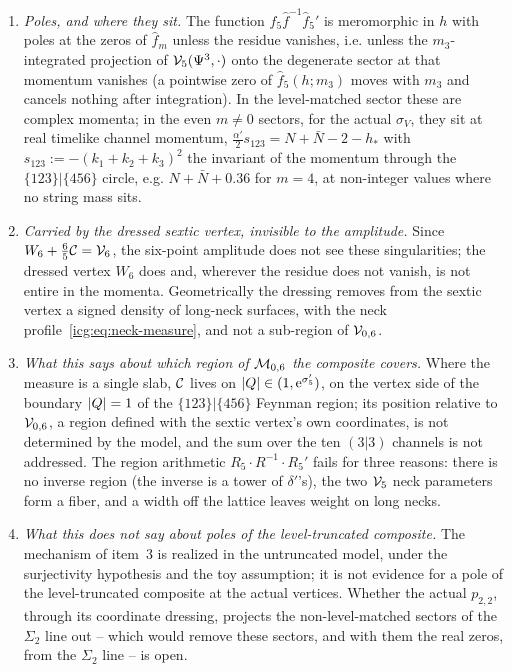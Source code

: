 \begin{enumerate}[leftmargin=*, itemsep=0.3ex]
    In all three cases it is neither a union of Feynman regions nor a sub-region with the standard measure.
  \item \emph{Poles, and where they sit.}
    The function $\hat f_5 \hat f^{-1} \hat f_5'$ is meromorphic in $h$ with poles at the zeros of $\hat f_m$ unless the residue vanishes, i.e. unless the $m_3$-integrated projection of ${\mathcal{V}}_5(\Psi^3, \cdot)$ onto the degenerate sector at that momentum vanishes (a pointwise zero of $\hat f_5(h; m_3)$ moves with $m_3$ and cancels nothing after integration).
    In the level-matched sector these are complex momenta; in the even $m \neq 0$ sectors, for the actual $\sigma_V$, they sit at real timelike channel momentum, $\tfrac{\alpha'}{2} s_{123} = N + \bar N - 2 - h_*$ with $s_{123} := -(k_1 + k_2 + k_3)^2$ the invariant of the momentum through the $\{123\}|\{456\}$ circle, e.g. $N + \bar N + 0.36$ for $m = 4$, at non-integer values where no string mass sits.
  \item \emph{Carried by the dressed sextic vertex, invisible to the amplitude.}
    Since $W_6 + \tfrac65 {\mathcal{C}} = {\mathcal{V}}_6$, the six-point amplitude does not see these singularities; the dressed vertex $W_6$ does and, wherever the residue does not vanish, is not entire in the momenta.
    Geometrically the dressing removes from the sextic vertex a signed density of long-neck surfaces, with the neck profile~\eqref{icg:eq:neck-measure}, and not a sub-region of ${\mathcal{V}}_{0,6}$.
  \item \emph{What this says about which region of ${\mathcal{M}}_{0,6}$ the composite covers.}
    Where the measure is a single slab, ${\mathcal{C}}$ lives on ${|Q|} \in (1, \mathrm{e}^{\sigma_5'})$, on the vertex side of the boundary ${|Q|} = 1$ of the $\{123\}|\{456\}$ Feynman region; its position relative to ${\mathcal{V}}_{0,6}$, a region defined with the sextic vertex's own coordinates, is not determined by the model, and the sum over the ten $(3|3)$ channels is not addressed.
    The region arithmetic $R_5 \cdot R^{-1} \cdot R_5'$ fails for three reasons: there is no inverse region (the inverse is a tower of $\delta'$'s), the two ${\mathcal{V}}_5$ neck parameters form a fiber, and a width off the lattice leaves weight on long necks.
  \item \emph{What this does not say about poles of the level-truncated composite.}
    The mechanism of item~3 is realized in the untruncated model, under the surjectivity hypothesis and the toy assumption; it is not evidence for a pole of the level-truncated composite at the actual vertices.
    Whether the actual $p_{2,2}$, through its coordinate dressing, projects the non-level-matched sectors of the $\Sigma_2$ line out – which would remove these sectors, and with them the real zeros, from the $\Sigma_2$ line – is open.
\end{enumerate}


